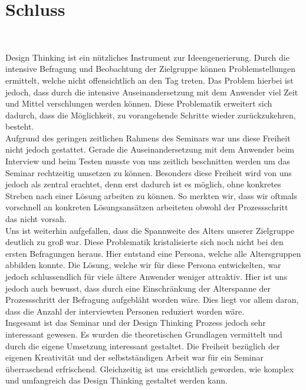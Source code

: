 \documentclass[12pt,ngerman, fleqn]{book} %
\begin{document}
\chapter{Schluss} \\
\setcounter{page}{20}

Design Thinking ist ein nützliches Instrument zur Ideengenerierung. Durch die intensive Befragung und Beobachtung der Zielgruppe können Problemstellungen ermittelt, welche nicht offensichtlich an den Tag treten. Das Problem hierbei ist jedoch, dass durch die intensive Auseinandersetzung mit dem Anwender viel Zeit und Mittel verschlungen werden können. Diese Problematik erweitert sich dadurch, dass die Möglichkeit, zu vorangehende Schritte wieder zurückzukehren, besteht.\\
Aufgrund des geringen zeitlichen Rahmens des Seminars war uns diese Freiheit nicht jedoch gestattet. Gerade die Auseinandersetzung mit dem Anwender beim Interview und beim Testen musste von uns zeitlich beschnitten werden um das Seminar rechtzeitig umsetzen zu können. Besonders diese Freiheit wird von uns jedoch als zentral erachtet, denn erst dadurch ist es möglich, ohne konkretes Streben nach einer Lösung arbeiten zu können. So merkten wir, dass wir oftmals vorschnell an konkreten Lösungsansätzen arbeiteten obwohl der Prozessschritt das nicht vorsah.\\
Uns ist weiterhin aufgefallen, dass die Spannweite des Alters unserer Zielgruppe deutlich zu groß war. Diese Problematik kristalisierte sich noch nicht bei den ersten Befragungen heraus. Hier entstand eine Persona, welche alle Altersgruppen abbilden konnte. Die Lösung, welche wir für diese Persona entwickelten, war jedoch schlussendlich für viele ältere Anwender weniger attraktiv. Hier ist uns jedoch auch bewusst, dass durch eine Einschränkung der Alterspanne der Prozessschritt der Befragung aufgebläht worden wäre. Dies liegt vor allem daran, dass die Anzahl der interviewten Personen reduziert worden wäre.\\
Insgesamt ist das Seminar und der Design Thinking Prozess jedoch sehr interessant gewesen. Es wurden die theoretischen Grundlagen vermittelt und durch die eigene Umsetzung interessant gestaltet. Die Freiheit bezüglich der eigenen Kreativität und der selbstständigen Arbeit war für ein Seminar überraschend erfrischend. Gleichzeitig ist uns ersichtlich geworden, wie komplex und umfangreich das Design Thinking gestaltet werden kann.

\appendix

\end{document}
